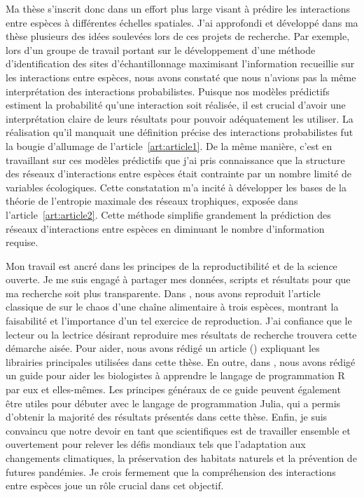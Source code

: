 \documentclass[12pt,twoside,phd]{dms}
\numberwithin{equation}{section}
\numberwithin{table}{chapter}
\numberwithin{figure}{chapter}
\begin{document}
Ma thèse s'inscrit donc dans un effort plus large visant à prédire les
interactions entre espèces à différentes échelles spatiales. J'ai approfondi et
développé dans ma thèse plusieurs des idées soulevées lors de ces projets de
recherche. Par exemple, lors d'un groupe de travail portant sur le développement
d'une méthode d'identification des sites d'échantillonnage maximisant
l'information recueillie sur les interactions entre espèces, nous avons constaté
que nous n'avions pas la même interprétation des interactions probabilistes.
Puisque nos modèles prédictifs estiment la probabilité qu'une interaction soit
réalisée, il est crucial d'avoir une interprétation claire de leurs résultats
pour pouvoir adéquatement les utiliser. La réalisation qu'il manquait une
définition précise des interactions probabilistes fut la bougie d'allumage de
l'article~\ref{art:article1}. De la même manière, c'est en travaillant sur ces
modèles prédictifs que j'ai pris connaissance que la structure des réseaux
d'interactions entre espèces était contrainte par un nombre limité de variables
écologiques. Cette constatation m'a incité à développer les bases de la théorie
de l'entropie maximale des réseaux trophiques, exposée dans
l'article~\ref{art:article2}. Cette méthode simplifie grandement la prédiction
des réseaux d'interactions entre espèces en diminuant le nombre d'information
requise. 

Mon travail est ancré dans les principes de la reproductibilité et de la science
ouverte. Je me suis engagé à partager mes données, scripts et résultats pour que
ma recherche soit plus transparente. Dans \textcite{Dansereau2020Re}, nous avons
reproduit l'article classique de \textcite{Hastings1991Chaos} sur le chaos d'une
chaîne alimentaire à trois espèces, montrant la faisabilité et l'importance d'un
tel exercice de reproduction. J'ai confiance que le lecteur ou la lectrice
désirant reproduire mes résultats de recherche trouvera cette démarche aisée.
Pour aider, nous avons rédigé un article (\cite{Banville2021Mangal}) expliquant
les librairies principales utilisées dans cette thèse. En outre, dans
\textcite{Lawlor2022Ten}, nous avons rédigé un guide pour aider les biologistes
à apprendre le langage de programmation R par eux et elles-mêmes. Les principes
généraux de ce guide peuvent également être utiles pour débuter avec le langage
de programmation Julia, qui a permis d'obtenir la majorité des résultats
présentés dans cette thèse. Enfin, je suis convaincu que notre devoir en tant
que scientifiques est de travailler ensemble et ouvertement pour relever les
défis mondiaux tels que l'adaptation aux changements climatiques, la
préservation des habitats naturels et la prévention de futures pandémies. Je
crois fermement que la compréhension des interactions entre espèces joue un rôle
crucial dans cet objectif. 
\end{document}
